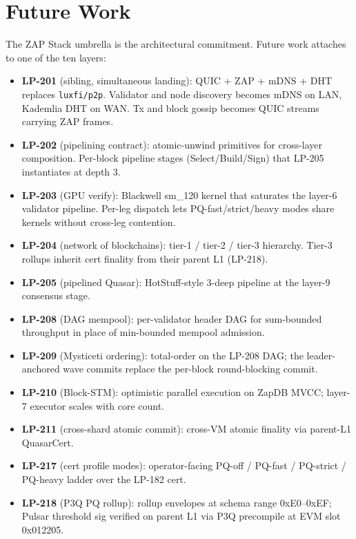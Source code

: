 \section{Future Work}

The ZAP Stack umbrella is the architectural commitment. Future work
attaches to one of the ten layers:

\begin{itemize}[leftmargin=2em,nosep]
\item \textbf{LP-201} (sibling, simultaneous landing): QUIC + ZAP +
  mDNS + DHT replaces \texttt{luxfi/p2p}. Validator and node
  discovery becomes mDNS on LAN, Kademlia DHT on WAN. Tx and block
  gossip becomes QUIC streams carrying ZAP frames.
\item \textbf{LP-202} (pipelining contract): atomic-unwind primitives
  for cross-layer composition. Per-block pipeline stages
  (Select/Build/Sign) that LP-205 instantiates at depth 3.
\item \textbf{LP-203} (GPU verify): Blackwell sm\_120 kernel that
  saturates the layer-6 validator pipeline. Per-leg dispatch lets
  PQ-fast/strict/heavy modes share kernels without cross-leg
  contention.
\item \textbf{LP-204} (network of blockchains): tier-1 / tier-2 /
  tier-3 hierarchy. Tier-3 rollups inherit cert finality from their
  parent L1 (LP-218).
\item \textbf{LP-205} (pipelined Quasar): HotStuff-style 3-deep
  pipeline at the layer-9 consensus stage.
\item \textbf{LP-208} (DAG mempool): per-validator header DAG for
  $\mathrm{sum}$-bounded throughput in place of
  $\mathrm{min}$-bounded mempool admission.
\item \textbf{LP-209} (Mysticeti ordering): total-order on the LP-208
  DAG; the leader-anchored wave commits replace the per-block
  round-blocking commit.
\item \textbf{LP-210} (Block-STM): optimistic parallel execution
  on ZapDB MVCC; layer-7 executor scales with core count.
\item \textbf{LP-211} (cross-shard atomic commit): cross-VM atomic
  finality via parent-L1 QuasarCert.
\item \textbf{LP-217} (cert profile modes): operator-facing PQ-off /
  PQ-fast / PQ-strict / PQ-heavy ladder over the LP-182 cert.
\item \textbf{LP-218} (P3Q PQ rollup): rollup envelopes at schema
  range 0xE0--0xEF; Pulsar threshold sig verified on parent L1 via
  P3Q precompile at EVM slot 0x012205.
\end{itemize}

